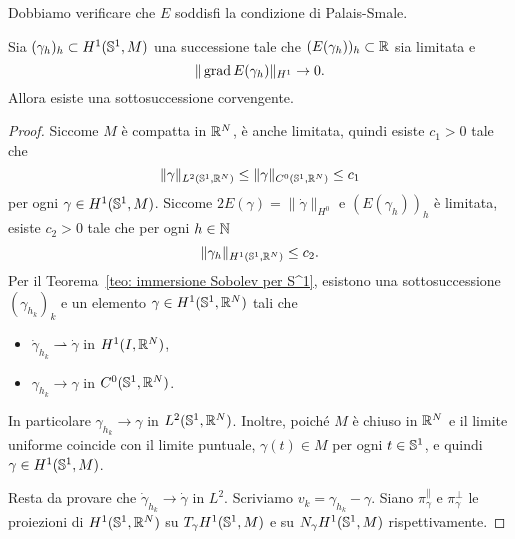 Dobbiamo verificare che \(E\) soddisfi la condizione di Palais-Smale. 
\begin{lemma}
	Sia \((\gamma_h)_h \subset H^1(\mathbb{S}^1,M)\) una successione tale che \((E(\gamma_h))_h \subset \mathbb{R}\) sia limitata e 
	\begin{equation*}
		\|\operatorname{grad} E(\gamma_h)\|_{H^1} \to 0.
	\end{equation*}
	Allora esiste una sottosuccessione corvengente. 
\end{lemma}
\begin{proof}
	Siccome \(M\) è compatta in \(\mathbb{R}^N\), è anche limitata, quindi esiste \(c_1>0\) tale che
	\[
		\|\gamma\|_{L^2(\mathbb{S}^1,\mathbb{R}^N)} \leq \|\gamma\|_{C^0(\mathbb{S}^1,\mathbb{R}^N)} \leq c_1
	\] 
	per ogni \(\gamma \in H^1(\mathbb{S}^1,M)\). Siccome \(2E(\gamma) = \|\dot \gamma\|_{H^0}\) e \((E(\gamma_h))_h\) è limitata, esiste \(c_2>0\) tale che per ogni \(h \in \mathbb{N}\)
	\[
		\|\gamma_h\|_{H^1(\mathbb{S}^1,\mathbb{R}^N)} \leq c_2.
	\]
	Per il Teorema~\ref{teo: immersione Sobolev per S^1}, esistono una sottosuccessione \((\gamma_{h_k})_k\) e un elemento \(\gamma \in H^1(\mathbb{S}^1,\mathbb{R}^N)\) tali che
	\begin{itemize}
		\item \(\dot \gamma_{h_k} \rightharpoonup \dot \gamma\) in \(H^1(I,\mathbb{R}^N)\),
		\item \(\gamma_{h_k} \to \gamma\) in \(C^0(\mathbb{S}^1,\mathbb{R}^N)\).
	\end{itemize}
	In particolare \(\gamma_{h_k} \to \gamma\) in \(L^2(\mathbb{S}^1,\mathbb{R}^N)\). Inoltre, poiché \(M\) è chiuso in \(\mathbb{R}^N\) e il limite uniforme coincide con il limite puntuale, \(\gamma(t) \in M\) per ogni \(t \in \mathbb{S}^1\), e quindi \(\gamma \in H^1(\mathbb{S}^1,M)\).
	
	Resta da provare che \(\dot \gamma_{h_k} \to \dot \gamma\) in \(L^2\). Scriviamo \(v_k = \gamma_{h_k}-\gamma\).
	Siano \(\pi^\parallel_\gamma\) e \(\pi^\perp_\gamma\) le proiezioni di \(H^1(\mathbb{S}^1,\mathbb{R}^N)\) su \(T_\gamma H^1(\mathbb{S}^1,M)\) e su \(N_\gamma H^1(\mathbb{S}^1,M)\) rispettivamente. 
	
	

\end{proof}
